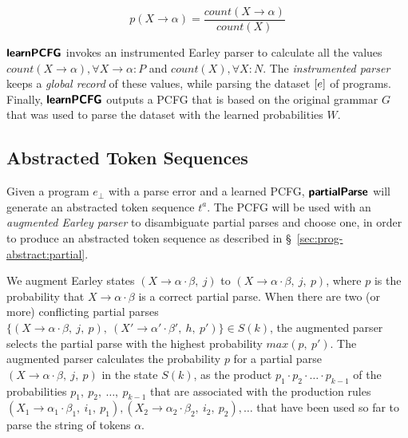 \begin{equation*}
    p(X \rightarrow \alpha) = \frac{count(X \rightarrow \alpha)}{count(X)}
\end{equation*}



$\bm{\mathsf{learnPCFG}}$ invokes an instrumented Earley parser to calculate all the
values $count(X \rightarrow \alpha), \forall X \rightarrow \alpha: P$ and
$count(X), \forall X: N$. The \emph{instrumented parser} keeps a \emph{global
record} of these values, while parsing the dataset $[e]$ of programs.
Finally, $\bm{\mathsf{learnPCFG}}$ outputs a PCFG that is based on the original grammar
$G$ that was used to parse the dataset with the learned probabilities $W$.

\subsection{Abstracted Token Sequences}

Given a program $e_{\bot}$ with a parse error and a learned PCFG, $\bm{\mathsf{partialParse}}$
will generate an abstracted token sequence $t^a$. The PCFG will be used with an
\emph{augmented Earley parser} to disambiguate partial parses and choose one, in
order to produce an abstracted token sequence as described in
\S~\ref{sec:prog-abstract:partial}.

%
We augment Earley states $(X \rightarrow \alpha \cdot \beta,\ j)$ to $(X
\rightarrow \alpha \cdot \beta,\ j,\ p)$, where $p$ is the probability that $X
\rightarrow \alpha \cdot \beta$ is a correct partial parse. When there are two
(or more) conflicting partial parses $\{(X \rightarrow \alpha \cdot \beta,\ j,\
p),\ (X' \rightarrow \alpha' \cdot \beta',\ h,\ p')\} \in S(k)$, the augmented
parser selects the partial parse with the highest probability $max(p,\ p')$. The
augmented parser calculates the probability $p$ for a partial parse $(X
\rightarrow \alpha \cdot \beta,\ j,\ p)$ in the state $S(k)$, as the product
$p_1 \cdot p_2 \cdot \dots \cdot p_{k-1}$ of the probabilities $p_1,\ p_2,\
\dots,\ p_{k-1}$ that are associated with the production rules $(X_1 \rightarrow
\alpha_1 \cdot \beta_1,\ i_1,\ p_1), (X_2 \rightarrow \alpha_2 \cdot \beta_2,\
i_2,\ p_2), \dots$ that have been used so far to parse the string of tokens
$\alpha$.
